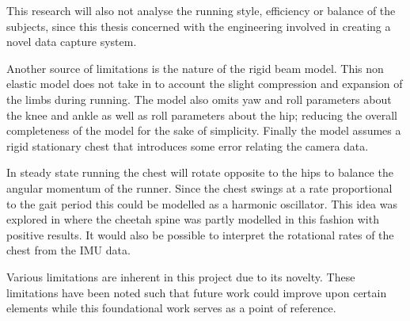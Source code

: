 This research will also not analyse the running style, efficiency or balance of the subjects, since this thesis concerned with the engineering involved in creating a novel data capture system. 

Another source of limitations is the nature of the rigid beam model. This non elastic model does not take in to account the slight compression and expansion of the limbs during running. The model also omits yaw and roll parameters about the knee and ankle as well as roll parameters about the hip; reducing the overall completeness of the model for the sake of simplicity. Finally the model assumes a rigid stationary chest that introduces some error relating the camera data.

In steady state running the chest will rotate opposite to the hips to balance the angular momentum of the runner. Since the chest swings at a rate proportional to the gait period this could be modelled as a harmonic oscillator. This idea was explored in \cite{patel2017trackingieee} where the cheetah spine was partly modelled in this fashion with positive results. It would also be possible to interpret the rotational rates of the chest from the IMU data.

Various limitations are inherent in this project due to its novelty. These limitations have been noted such that future work could improve upon certain elements while this foundational work serves as a point of reference.

 









 



















